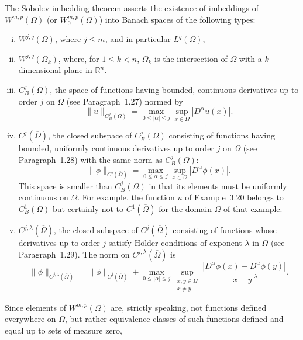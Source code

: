 \begin{para}
  The Sobolev imbedding theorem asserts the existence of imbeddings of $W^{m,p}(\Omega)$
  (or $W_0^{m, p}(\Omega)$) into Banach spaces of the following types:
  \begin{enumerate}[(i)]
    \item $W^{j,q}(\Omega)$, where $j \leq m$, and in particular $L^q(\Omega)$,
    \item $W^{j,q}(\Omega_k)$, where, for $1 \leq k<n$,
      $\Omega_k$ is the intersection of $\Omega$ with a
      $k$-dimensional plane in $\mathbb{R}^n$.
    \item $C_B^j(\Omega)$, the space of functions having bounded,
      continuous derivatives up to order $j$ on $\Omega$ (see Paragraph~1.27) normed by
      \[
        \|u\|_{C_B^j(\Omega)} = \max_{0 \leq|\alpha| \leq j} \sup_{x \in \Omega}\left|D^\alpha u(x)\right|.
      \]
    \item $C^j(\overline{\Omega})$, the closed subspace of $C_B^j(\Omega)$ consisting of functions
      having bounded, uniformly continuous derivatives up to order $j$ on $\Omega$
      (see Paragraph~1.28) with the same norm as $C_B^j(\Omega)$:
      \[
        \|\phi\|_{C^j(\overline{\Omega})} 
          = \max_{0 \leq \alpha \leq j} \sup_{x \in \Omega} \left|D^\alpha \phi(x)\right|.
      \]
      This space is smaller than $C_B^j(\Omega)$ in that its elements must be uniformly continuous 
      on $\Omega$. For example, the function $u$ of Example~3.20 belongs to $C_B^1(\Omega)$ but 
      certainly not to $C^1(\overline{\Omega})$ for the domain $\Omega$ of that example.
    \item $C^{j, \lambda}(\overline{\Omega})$, the closed subspace of $C^j(\overline{\Omega})$ consisting of 
      functions whose derivatives up to order $j$ satisfy Hölder conditions of exponent $\lambda$ 
      in $\Omega$ (see Paragraph~1.29). The norm on $C^{j, \lambda}(\overline{\Omega})$ is
      \[
        \|\phi\|_{C^{j, \lambda}(\overline{\Omega})}
          = \|\phi\|_{C^j(\overline{\Omega})}
            + \max_{0 \leq|\alpha| \leq j} \sup_{\substack{x, y \in \Omega \\ x \neq y}}
              \frac{\left|D^\alpha \phi(x)-D^\alpha \phi(y)\right|}{|x-y|^\lambda} .
      \]
  \end{enumerate}
  Since elements of $W^{m,p}(\Omega)$ are, strictly speaking,
  not functions defined everywhere on $\Omega$, but rather equivalence classes of such functions defined and equal up to sets of measure zero,

\end{para}
